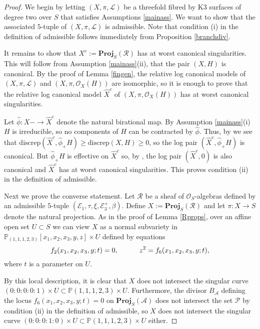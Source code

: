 \documentclass{amsart}
\begin{document}
\begin{proof} We begin by letting $(X,\pi,{\mathcal{L}})$ be a threefold fibred by K3 surfaces of degree two over $S$ that satisfies Assumptions \ref{mainass}. We want to show that the associated $5$-tuple of $(X,\pi,{\mathcal{L}})$ is admissible. Note that condition (i) in the definition of admissible follows immediately from Proposition \ref{branchdiv}.

It remains to show that $X^c := \mathbf{Proj}_S({\mathcal{R}})$ has at worst canonical singularities. This will follow from Assumption \ref{mainass}(ii), that the pair $(X,H)$ is canonical. By the proof of Lemma \ref{fingen}, the relative log canonical models of $(X,\pi,{\mathcal{L}})$ and $(X,\pi,{\mathcal{O}}_X(H))$ are isomorphic, so it is enough to prove that the relative log canonical model $\hat{X}^c$ of $(X,\pi,{\mathcal{O}}_X(H))$ has at worst canonical singularities. 

Let $\hat{\phi}\colon X - \to \hat{X}^c$ denote the natural birational map. By Assumption \ref{mainass}(i) $H$ is irreducible, so no components of $H$ can be contracted by $\hat{\phi}$. Thus, by \cite[Proposition 3.51]{bgav} we see that $\mathrm{discrep}(\hat{X}^{c},\hat{\phi}_+H) \geq \mathrm{discrep}(X,H) \geq 0$, so the log pair $(\hat{X}^{c},\hat{\phi}_+H)$ is canonical. But $\hat{\phi}_+H$ is effective on $\hat{X}^{c}$ so, by \cite[Corollary 2.35]{bgav}, the log pair $(\hat{X}^{c},0)$ is also canonical and $\hat{X}^{c}$ has at worst canonical singularities. This proves condition (ii) in the definition of admissible.

Next we prove the converse statement. Let ${\mathcal{R}}$ be a sheaf of ${\mathcal{O}}_S$-algebras defined by an admissible $5$-tuple $({\mathcal{E}}_1,\tau,\xi,{\mathcal{E}}_3^+,\beta)$. Define $X := \mathbf{Proj}_S({\mathcal{R}})$ and let $\pi\colon X \to S$ denote the natural projection. As in the proof of Lemma \ref{Rprops}, over an affine open set $U \subset S$ we can view $X$ as a normal subvariety in ${\mathbb{P}}_{(1,1,1,2,3)}[x_1,x_2,x_3,y,z] \times U$ defined by equations
\[ f_2(x_1,x_2,x_3,y;t) = 0, \makebox[3em]{} z^2 = f_6(x_1,x_2,x_3,y;t),\]
where $t$ is a parameter on $U$.

By this local description, it is clear that $X$ does not intersect the singular curve $(0\!:\!0\!:\!0\!:\!0\!:\!1) \times U \subset {\mathbb{P}}{(1,1,1,2,3)} \times U$. Furthermore, the divisor $B_{\mathcal{A}}$ defining the locus $f_6(x_1,x_2,x_3,y;t)=0$ on $\mathbf{Proj}_S({\mathcal{A}})$ does not intersect the set ${\mathcal{P}}$ by condition (ii) in the definition of admissible, so $X$ does not intersect the singular curve \mbox{$(0\!:\!0\!:\!0\!:\!1\!:\!0) \times U \subset {\mathbb{P}}{(1,1,1,2,3)} \times U$} either.


\end{proof}
\end{document}
